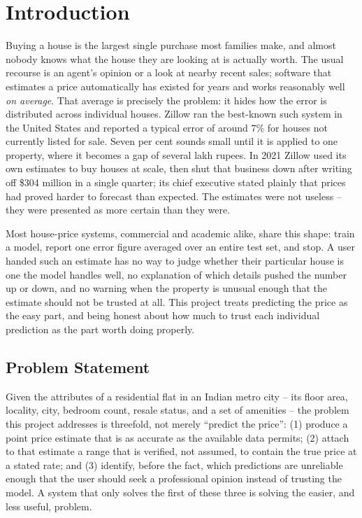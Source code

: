 \documentclass[12pt]{report}
\begin{document}
\chapter{Introduction}

Buying a house is the largest single purchase most families make, and almost nobody
knows what the house they are looking at is actually worth. The usual recourse is an
agent's opinion or a look at nearby recent sales; software that estimates a price
automatically has existed for years and works reasonably well \emph{on average}. That
average is precisely the problem: it hides how the error is distributed across
individual houses. Zillow ran the best-known such system in the United States and
reported a typical error of around 7\% for houses not currently listed for sale. Seven
per cent sounds small until it is applied to one property, where it becomes a gap of
several lakh rupees. In 2021 Zillow used its own estimates to buy houses at scale,
then shut that business down after writing off \$304 million in a single quarter; its
chief executive stated plainly that prices had proved harder to forecast than
expected. The estimates were not useless -- they were presented as more certain than
they were.

Most house-price systems, commercial and academic alike, share this shape: train a
model, report one error figure averaged over an entire test set, and stop. A user
handed such an estimate has no way to judge whether their particular house is one the
model handles well, no explanation of which details pushed the number up or down, and
no warning when the property is unusual enough that the estimate should not be
trusted at all. This project treats predicting the price as the easy part, and being
honest about how much to trust each individual prediction as the part worth doing
properly.

\section{Problem Statement}
Given the attributes of a residential flat in an Indian metro city -- its floor
area, locality, city, bedroom count, resale status, and a set of amenities -- the
problem this project addresses is threefold, not merely ``predict the price'':
(1) produce a point price estimate that is as accurate as the available data
permits; (2) attach to that estimate a range that is verified, not assumed, to
contain the true price at a stated rate; and (3) identify, before the fact, which
predictions are unreliable enough that the user should seek a professional opinion
instead of trusting the model. A system that only solves the first of these three is
solving the easier, and less useful, problem.
\end{document}
